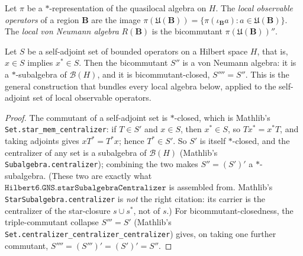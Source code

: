 \begin{definition}
    \label{def:local-von-neumann}
    \leanok
    Let $\pi$ be a $*$-representation of the quasilocal algebra on $H$. The \emph{local observable operators} of a region $\mathbf{B}$ are the image $\pi(\mathfrak{U}(\mathbf{B})) = \{\pi(\iota_{\mathbf{B}} a) : a \in \mathfrak{U}(\mathbf{B})\}$. The \emph{local von Neumann algebra} $R(\mathbf{B})$ is the bicommutant $\pi(\mathfrak{U}(\mathbf{B}))''$.
\end{definition}

\begin{lemma}
    \label{lmm:bicommutant-of-selfadjoint-is-von-neumann}
    \leanok
    Let $S$ be a self-adjoint set of bounded operators on a Hilbert space $H$, that is, $x \in S$ implies $x^* \in S$. Then the bicommutant $S''$ is a von Neumann algebra: it is a $*$-subalgebra of $\mathcal{B}(H)$, and it is bicommutant-closed, $S'''' = S''$. This is the general construction that bundles every local algebra below, applied to the self-adjoint set of local observable operators.
\end{lemma}
\begin{proof}
    \leanok
    The commutant of a self-adjoint set is $*$-closed, which is Mathlib's \texttt{Set.star\_mem\_centralizer}: if $T \in S'$ and $x \in S$, then $x^* \in S$, so $T x^* = x^* T$, and taking adjoints gives $x T^* = T^* x$; hence $T^* \in S'$. So $S'$ is itself $*$-closed, and the centralizer of any set is a subalgebra of $\mathcal{B}(H)$ (Mathlib's \texttt{Subalgebra.centralizer}); combining the two makes $S'' = (S')'$ a $*$-subalgebra. (These two are exactly what $\mathtt{Hilbert6.GNS.starSubalgebraCentralizer}$ is assembled from. Mathlib's \texttt{StarSubalgebra.centralizer} is \emph{not} the right citation: its carrier is the centralizer of the star-closure $s \cup s^*$, not of $s$.) For bicommutant-closedness, the triple-commutant collapse $S''' = S'$ (Mathlib's \texttt{Set.centralizer\_centralizer\_centralizer}) gives, on taking one further commutant, $S'''' = (S''')' = (S')' = S''$.
\end{proof}

